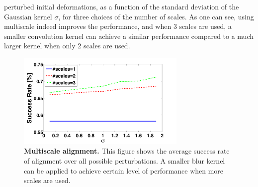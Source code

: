 \documentclass[12pt,journal,draftcls,letterpaper,onecolumn]{IEEEtran}
\providecommand{\DIFaddbeginFL}{} %
\providecommand{\DIFaddendFL}{} %
\providecommand{\DIFdelbeginFL}{} %
\providecommand{\DIFdelendFL}{} %
\begin{document}
perturbed initial deformations, as a function of the
standard deviation of the Gaussian kernel $\sigma$, for
three choices of the number of scales. As one can see,
using multiscale indeed improves the performance, and when
3 scales are used, a smaller convolution kernel can achieve
a similar performance compared to a much larger kernel when
only 2 scales are used.
\begin{figure}
\centering
\includegraphics[height=1.8in]{figures_pami/multiscale.png}
\caption{{\bf Multiscale alignment.} This figure shows the average success rate of alignment over all possible perturbations. A smaller blur kernel can be applied to achieve certain level of performance when more scales are used.}
\label{fig:multiscale}
\DIFdelbeginFL %
\DIFdelendFL \DIFaddbeginFL \vspace{-.2in}
\DIFaddendFL \end{figure}
\end{document}
